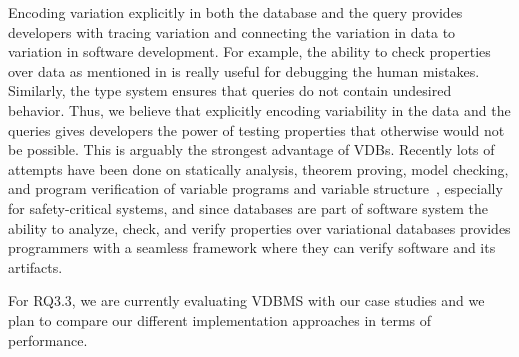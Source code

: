  
%
%
Encoding variation explicitly in both the database and the query
provides developers with tracing variation and connecting
the variation in data to variation in software development.
For example,
the ability to check properties over data as mentioned in
 is really useful for debugging the
human mistakes. Similarly, the type system ensures that 
queries do not contain undesired behavior. 
%
Thus, we believe that explicitly
encoding variability in the data and the queries gives developers the 
power of testing properties that otherwise would not be possible. 
This is arguably the strongest advantage of VDBs. Recently
lots of attempts have been done
on statically analysis, theorem proving, model checking, and program verification
of variable programs and 
variable structure~\cite{brkts20vamos, bks11fvoos, ldl07jss, tmbhvs14}, especially 
for safety-critical systems,
 and since databases are part of 
software system the ability to analyze, check, and verify 
properties over variational databases provides programmers
with a seamless framework where they can verify software
and its artifacts.
%



For RQ3.3, we are currently evaluating VDBMS with our case studies and we plan
to compare our different implementation approaches in terms of performance.
 
 
%
%
%
%